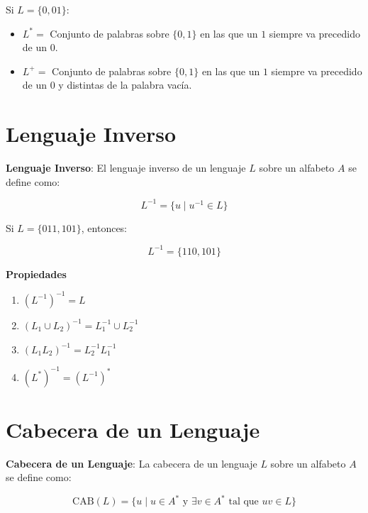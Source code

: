 \documentclass[12pt]{book} %
\providecommand{\tightlist}{%
  \setlength{\itemsep}{0pt}\setlength{\parskip}{0pt}}
\begin{document}
\begin{ejemplo}
Si $L = \{0, 01\}$:  
    \begin{itemize}
        \item $L^* =$ Conjunto de palabras sobre $\{0, 1\}$ en las que un $1$ siempre va precedido de un $0$.  
        \item $L^+ =$ Conjunto de palabras sobre $\{0, 1\}$ en las que un $1$ siempre va precedido de un $0$ y distintas de la palabra vacía.  
    \end{itemize}
\end{ejemplo}

\hypertarget{lenguaje-inverso}{%
\section{Lenguaje Inverso}\label{lenguaje-inverso}}

\begin{definicion}
\textbf{Lenguaje Inverso}: El lenguaje inverso de un lenguaje $L$ sobre un alfabeto $A$ se define como:

$$
L^{-1} = \{u \mid u^{-1} \in L\}
$$
\end{definicion}

\begin{ejemplo}
Si $L = \{011, 101\}$, entonces:

$$
L^{-1} = \{110, 101\}
$$
\end{ejemplo}

\textbf{Propiedades}

\begin{enumerate}
\def\labelenumi{\arabic{enumi}.}
\tightlist
\item
  \((L^{-1})^{-1} = L\)\\
\item
  \((L_1 \cup L_2)^{-1} = L_1^{-1} \cup L_2^{-1}\)\\
\item
  \((L_1L_2)^{-1} = L_2^{-1}L_1^{-1}\)\\
\item
  \((L^*)^{-1} = (L^{-1})^*\)
\end{enumerate}

\hypertarget{cabecera-de-un-lenguaje}{%
\section{Cabecera de un Lenguaje}\label{cabecera-de-un-lenguaje}}

\begin{definicion}
\textbf{Cabecera de un Lenguaje}: La cabecera de un lenguaje $L$ sobre un alfabeto $A$ se define como:

$$
\text{CAB}(L) = \{u \mid u \in A^* \text{ y } \exists v \in A^* \text{ tal que } uv \in L\}
$$
\end{definicion}
\end{document}

